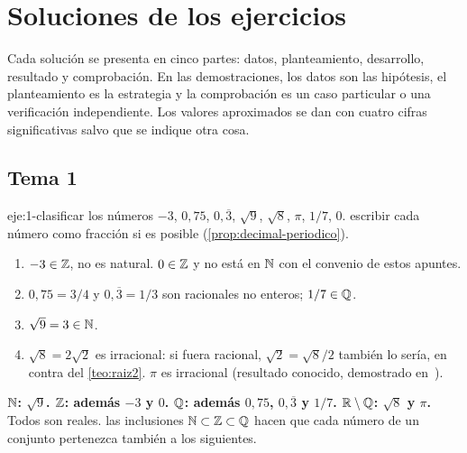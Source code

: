 \chapter{Soluciones de los ejercicios}
\label{ap:soluciones}

Cada solución se presenta en cinco partes: datos, planteamiento, desarrollo, resultado y comprobación. En las demostraciones, los datos son las hipótesis, el planteamiento es la estrategia y la comprobación es un caso particular o una verificación independiente. Los valores aproximados se dan con cuatro cifras significativas salvo que se indique otra cosa.

\section{Tema 1}

\begin{solucion}{eje:1-clasificar}
\datos los números $-3$, $0{,}75$, $0{,}\overline3$, $\sqrt9$, $\sqrt8$, $\pi$, $1/7$, $0$.
\planteamiento escribir cada número como fracción si es posible (\cref{prop:decimal-periodico}).
\pasos
\begin{enumerate}[label=\arabic*.]
  \item $-3\in\mathbb{Z}$, no es natural. $0\in\mathbb{Z}$ y no está en $\mathbb{N}$ con el convenio de estos apuntes.
  \item $0{,}75=3/4$ y $0{,}\overline3=1/3$ son racionales no enteros; $1/7\in\mathbb{Q}$.
  \item $\sqrt9=3\in\mathbb{N}$.
  \item $\sqrt8=2\sqrt2$ es irracional: si fuera racional, $\sqrt2=\sqrt8/2$ también lo sería, en contra del \cref{teo:raiz2}. $\pi$ es irracional (resultado conocido, demostrado en~\cite[cap.~16]{spivak}).
\end{enumerate}
\resultado \textbf{$\mathbb{N}$: $\sqrt9$. $\mathbb{Z}$: además $-3$ y $0$. $\mathbb{Q}$: además $0{,}75$, $0{,}\overline3$ y $1/7$. $\mathbb{R}\setminus\mathbb{Q}$: $\sqrt8$ y $\pi$.} Todos son reales.
\comprobacion las inclusiones $\mathbb{N}\subset\mathbb{Z}\subset\mathbb{Q}$ hacen que cada número de un conjunto pertenezca también a los siguientes.
\end{solucion}

